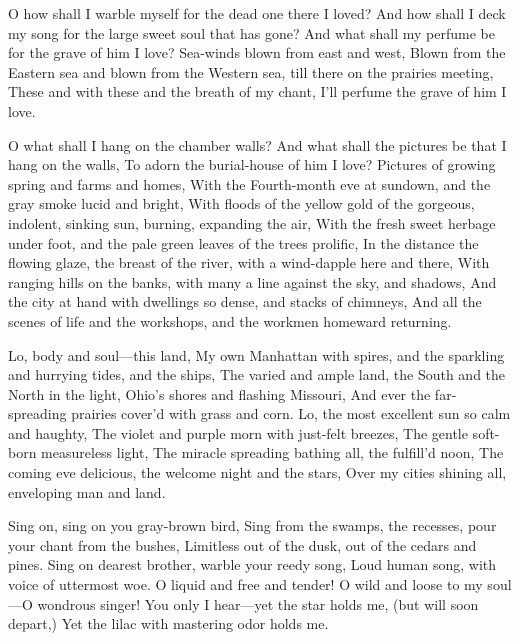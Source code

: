 \documentclass[11pt]{book}
\newenvironment {poem} [1]
 {\titulus{#1}%
  \versus
  \Nstanza{0}%
  \numerus{1}}
 {\endversus}
\begin{document}
\begin{poem}{When Lilacs Last in the Dooryard Bloom'd}
\stropha %

O how shall I warble myself for the dead one there I loved?
And how shall I deck my song for the large sweet soul that has gone?
And what shall my perfume be for the grave of him I love?
     \vacua
Sea-winds blown from east and west,
Blown from the Eastern sea and blown from the Western sea, till %
    there on the prairies meeting,
These and with these and the breath of my chant,
I'll perfume the grave of him I love.

\stropha %

O what shall I hang on the chamber walls?
And what shall the pictures be that I hang on the walls,
To adorn the burial-house of him I love?
Pictures of growing spring and farms and homes,
With the Fourth-month eve at sundown, and the gray smoke lucid and bright,
With floods of the yellow gold of the gorgeous, indolent, sinking %
    sun, burning, expanding the air,
With the fresh sweet herbage under foot, and the pale green leaves %
    of the trees prolific,
In the distance the flowing glaze, the breast of the river, with a %
    wind-dapple here and there,
With ranging hills on the banks, with many a line against the sky, %
    and shadows,
And the city at hand with dwellings so dense, and stacks of chimneys,
And all the scenes of life and the workshops, and the work\-men %
    homeward returning.

\stropha %

Lo, body and soul---this land,
My own Manhattan with spires, and the sparkling and hurrying tides, %
    and the ships,
The varied and ample land, the South and the North in the light, %
    Ohio's shores and flashing Missouri,
And ever the far-spreading prairies cover'd with grass and corn.
     \vacua
Lo, the most excellent sun so calm and haughty,
The violet and purple morn with just-felt breezes,
The gentle soft-born measureless light,
The miracle spreading bathing all, the fulfill'd noon,
The coming eve delicious, the welcome night and the stars,
Over my cities shining all, enveloping man and land.

\stropha %

Sing on, sing on you gray-brown bird,
Sing from the swamps, the recesses, pour your chant from the bushes,
Limitless out of the dusk, out of the cedars and pines.
     \vacua
Sing on dearest brother, warble your reedy song,
Loud human song, with voice of uttermost woe.
     \vacua
O liquid and free and tender!
O wild and loose to my soul---O wondrous singer!
You only I hear---yet the star holds me, (but will soon depart,)
Yet the lilac with mastering odor holds me.


\end{poem}
\end{document}
